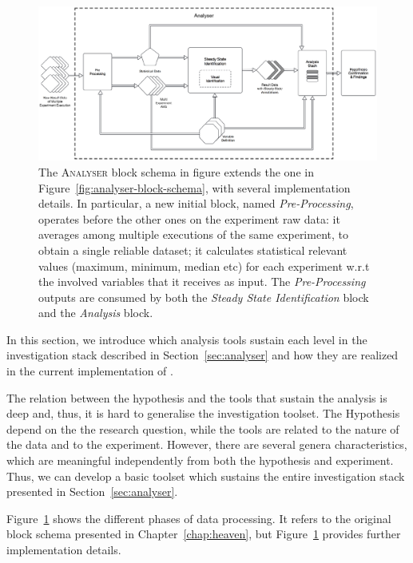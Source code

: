 \begin{figure}[tbh]
  \centering
	\includegraphics[width=\linewidth]{images/analyser-block-schema-impl}
	\caption[\textsc{Analyser} Block Schema: Implementation Detail Level]{The \textsc{Analyser} block schema in figure extends the one in Figure~\ref{fig:analyser-block-schema}, with several implementation details. In particular, a new initial block, named \textit{Pre-Processing}, operates before the other ones on the experiment raw data: it averages among multiple executions of the same experiment, to obtain a single reliable dataset; it calculates statistical relevant values (maximum, minimum, median etc) for each experiment w.r.t the involved variables that it receives as input. The \textit{Pre-Processing} outputs are consumed by both the \textit{Steady State Identification} block and the \textit{Analysis} block.}
  	\label{fig:analyser-block-schema-impl}
\end{figure}

\noindent In this section, we introduce which analysis tools sustain each level in the investigation stack described in Section~\ref{sec:analyser} and how they are realized in the current implementation of \namens. 

The relation between the hypothesis and the tools that sustain the analysis is deep and, thus, it is hard to generalise the investigation toolset. The Hypothesis depend on the the research question, while the tools are related to the nature of the data and to the experiment. However, there are several genera characteristics, which are meaningful independently from both the hypothesis and experiment. Thus, we can develop a basic toolset which sustains the entire investigation stack presented in Section~\ref{sec:analyser}.

Figure~\ref{fig:analyser-block-schema-impl} shows the different phases of data processing. It refers to the original block schema presented in Chapter~\ref{chap:heaven}, but Figure~\ref{fig:analyser-block-schema-impl} provides further implementation details.\\ 


